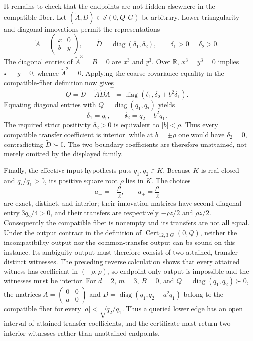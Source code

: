 It remains to check that the endpoints are not hidden elsewhere in the compatible fiber.  Let \((\widetilde A,\widetilde D)\in\mathcal S(0,Q;G)\) be arbitrary.  Lower triangularity and diagonal innovations permit the representations
\[
\widetilde A=\left(\begin{smallmatrix}x&0\\ b&y\end{smallmatrix}\right),
\qquad
\widetilde D=\operatorname{diag}(\delta_1,\delta_2),
\qquad
\delta_1>0,\quad\delta_2>0.
\]
The diagonal entries of \(\widetilde A^3=B=0\) are \(x^3\) and \(y^3\).  Over \(\mathbb R\), \(x^3=y^3=0\) implies \(x=y=0\), whence \(\widetilde A^2=0\).  Applying the coarse-covariance equality in the compatible-fiber definition now gives
\[
Q
=\widetilde D+\widetilde A\widetilde D\widetilde A^{\top}
=\operatorname{diag}(\delta_1,\delta_2+b^2\delta_1).
\]
Equating diagonal entries with \(Q=\operatorname{diag}(q_1,q_2)\) yields
\[
\delta_1=q_1,
\qquad
\delta_2=q_2-b^2q_1.
\]
The required strict positivity \(\delta_2>0\) is equivalent to \(|b|<\rho\).  Thus every compatible transfer coefficient is interior, while at \(b=\pm\rho\) one would have \(\delta_2=0\), contradicting \(\widetilde D\succ0\).  The two boundary coefficients are therefore unattained, not merely omitted by the displayed family.

Finally, the effective-input hypothesis puts \(q_1,q_2\in K\).  Because \(K\) is real closed and \(q_2/q_1>0\), its positive square root \(\rho\) lies in \(K\).  The choices
\[
a_-=-\frac{\rho}{2},
\qquad
a_+=\frac{\rho}{2}
\]
are exact, distinct, and interior; their innovation matrices have second diagonal entry \(3q_2/4>0\), and their transfers are respectively \(-\rho z/2\) and \(\rho z/2\).  Consequently the compatible fiber is nonempty and its transfers are not all equal.  Under the output contract in the definition of \(\operatorname{Cert}_{12,3,G}(0,Q)\), neither the incompatibility output nor the common-transfer output can be sound on this instance.  Its ambiguity output must therefore consist of two attained, transfer-distinct witnesses.  The preceding reverse calculation shows that every attained witness has coefficient in \((-\rho,\rho)\), so endpoint-only output is impossible and the witnesses must be interior.
For \(d=2\), \(m=3\), \(B=0\), and \(Q=\operatorname{diag}(q_1,q_2)\succ0\), the matrices \(A=\left(\begin{smallmatrix}0&0\\a&0\end{smallmatrix}\right)\) and \(D=\operatorname{diag}(q_1,q_2-a^2q_1)\) belong to the compatible fiber for every \(|a|<\sqrt{q_2/q_1}\). Thus a queried lower edge has an open interval of attained transfer coefficients, and the certificate must return two interior witnesses rather than unattained endpoints.
